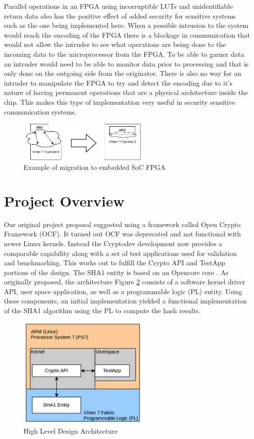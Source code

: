 \documentclass[journal]{IEEEtran}
\begin{document}
Parallel operations in an FPGA using incorruptible LUTs and unidentifiable return data also has the positive effect of added security for sensitive systems such as the one being implemented here.  When a possible intrusion to the system would reach the encoding of the FPGA there is a blockage in communication that would not allow the intruder to see what operations are being done to the incoming data to the microprocessor from the FPGA.  To be able to garner data an intruder would need to be able to monitor data prior to processing and that is only done on the outgoing side from the originator.  There is also no way for an intruder to manipulate the FPGA to try and detect the encoding due to it’s nature of having permanent operations that are a physical architecture inside the chip.  This makes this type of implementation very useful in security sensitive communication systems.

\begin{figure}[ht]
\centering
\includegraphics[width=2.5in]{socBlk.png}
\caption{Example of migration to embedded SoC FPGA}
\label{fig_socBlk}
\end{figure} 

\section{Project Overview}
Our original project proposal suggested using a framework called Open Crypto Framework (OCF)\cite{OCF2013}.  It turned out OCF was deprecated and not functional with newer Linux kernels.  Instead the Cryptodev development now provides a comparable capability along with a set of test applications used for validation and benchmarking.  This works out to fulfill the Crypto API and TestApp portions of the design.  The SHA1 entity is based on an Opencore core
.
As originally proposed, the architecture Figure \ref{fig_archBlkH} consists of a software kernel driver API, user space application, as well as a programmable logic (PL) entity.  Using these components, an initial implementation yielded a functional implementation of the SHA1 algorithm using the PL to compute the hash results.

\begin{figure}[ht]
\centering
\includegraphics[width=2.5in]{highleveldesigndiagram.png}
\caption{High Level Design Architecture}
\label{fig_archBlkH}
\end{figure} 
\end{document}
